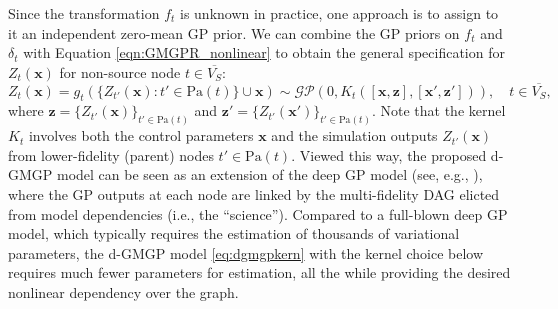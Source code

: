 \documentclass[12pt]{article}
\newcommand{\bs}[1]{\boldsymbol{#1}}
\begin{document}
Since the transformation $f_t$ is unknown in practice, one approach is to assign to it an independent zero-mean GP prior. We can combine the GP priors on $f_t$ and $\delta_t$ with Equation \eqref{eqn:GMGPR_nonlinear} to obtain the general specification for $Z_t(\bs{x})$ for non-source node $t \in \overline{V_S}$:
\begin{equation}
Z_t(\bs{x}) = g_t(\{Z_{t'}(\bs{x}):t'\in \text{Pa}(t)\} \cup \bs{x}) \sim \mathcal{GP}(0,K_t([\bs{x},\bs{z}],[\bs{x}',\bs{z}'])),\quad t \in \overline{V_S},
\label{eq:dgmgpkern}
\end{equation}
where $\bs{z} = \{Z_{t'}(\bs{x})\}_{t'\in \text{Pa}(t)}$ and $\bs{z}' = \{Z_{t'}(\bs{x}')\}_{t'\in \text{Pa}(t)}$.
Note that the kernel $K_t$ involves both the control parameters $\bs{x}$ and the simulation outputs $Z_{t'}(\bs{x})$ from lower-fidelity (parent) nodes $t' \in \text{Pa}(t)$. Viewed this way, the proposed d-GMGP model can be seen as an extension of the deep GP model (see, e.g., \citealp{DeepGP}), where the GP outputs at each node are linked by the multi-fidelity DAG elicted from model dependencies (i.e., the ``science''). Compared to a full-blown deep GP model, which typically requires the estimation of thousands of variational parameters, the d-GMGP model \eqref{eq:dgmgpkern} with the kernel choice below requires much fewer parameters for estimation, all the while providing the desired nonlinear dependency over the graph.
\end{document}
